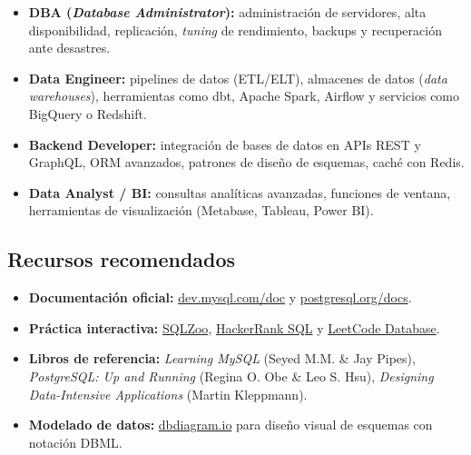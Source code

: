\begin{itemize}
  \item \textbf{DBA (\textit{Database Administrator}):} administración de
        servidores, alta disponibilidad, replicación, \textit{tuning} de
        rendimiento, backups y recuperación ante desastres.
  \item \textbf{Data Engineer:} pipelines de datos (ETL/ELT), almacenes de
        datos (\textit{data warehouses}), herramientas como dbt, Apache
        Spark, Airflow y servicios como BigQuery o Redshift.
  \item \textbf{Backend Developer:} integración de bases de datos en APIs
        REST y GraphQL, ORM avanzados, patrones de diseño de esquemas,
        caché con Redis.
  \item \textbf{Data Analyst / BI:} consultas analíticas avanzadas,
        funciones de ventana, herramientas de visualización (Metabase,
        Tableau, Power BI).
\end{itemize}

\subsection*{Recursos recomendados}

\begin{itemize}
  \item \textbf{Documentación oficial:}
        \href{https://dev.mysql.com/doc/}{dev.mysql.com/doc} y
        \href{https://www.postgresql.org/docs/}{postgresql.org/docs}.
  \item \textbf{Práctica interactiva:}
        \href{https://sqlzoo.net}{SQLZoo},
        \href{https://www.hackerrank.com/domains/sql}{HackerRank SQL} y
        \href{https://leetcode.com/problemset/database/}{LeetCode Database}.
  \item \textbf{Libros de referencia:}
        \textit{Learning MySQL} (Seyed M.M. \& Jay Pipes),
        \textit{PostgreSQL: Up and Running} (Regina O. Obe \& Leo S. Hsu),
        \textit{Designing Data-Intensive Applications} (Martin Kleppmann).
  \item \textbf{Modelado de datos:}
        \href{https://dbdiagram.io}{dbdiagram.io} para diseño visual de
        esquemas con notación DBML.
\end{itemize}

\printbibliography[heading=bibintoc, title={Referencias}]